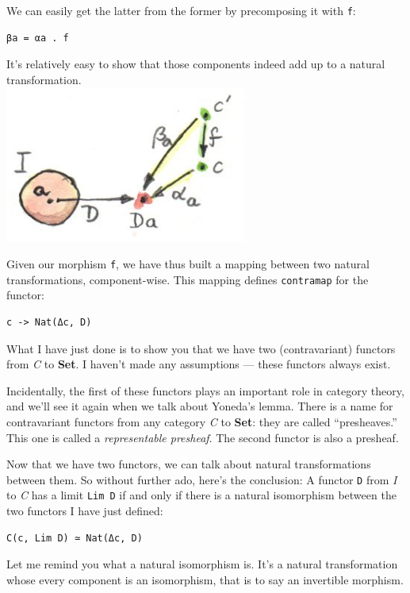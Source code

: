 We can easily get the latter from the former by precomposing it with
\texttt{f}:

\begin{verbatim}
βa = αa . f
\end{verbatim}

It's relatively easy to show that those components indeed add up to a
natural transformation.\\
\includegraphics[width=3.12500in]{images/natmapping.jpg}

Given our morphism \texttt{f}, we have thus built a mapping between two
natural transformations, component-wise. This mapping defines
\texttt{contramap} for the functor:

\begin{verbatim}
c -> Nat(Δc, D)
\end{verbatim}

What I have just done is to show you that we have two (contravariant)
functors from \emph{C} to \textbf{Set}. I haven't made any assumptions
--- these functors always exist.

Incidentally, the first of these functors plays an important role in
category theory, and we'll see it again when we talk about Yoneda's
lemma. There is a name for contravariant functors from any category
\emph{C} to \textbf{Set}: they are called ``presheaves.'' This one is
called a \emph{representable presheaf}. The second functor is also a
presheaf.

Now that we have two functors, we can talk about natural transformations
between them. So without further ado, here's the conclusion: A functor
\texttt{D} from \emph{I} to \emph{C} has a limit \texttt{Lim\ D} if and
only if there is a natural isomorphism between the two functors I have
just defined:

\begin{verbatim}
C(c, Lim D) ≃ Nat(Δc, D)
\end{verbatim}

Let me remind you what a natural isomorphism is. It's a natural
transformation whose every component is an isomorphism, that is to say
an invertible morphism.

